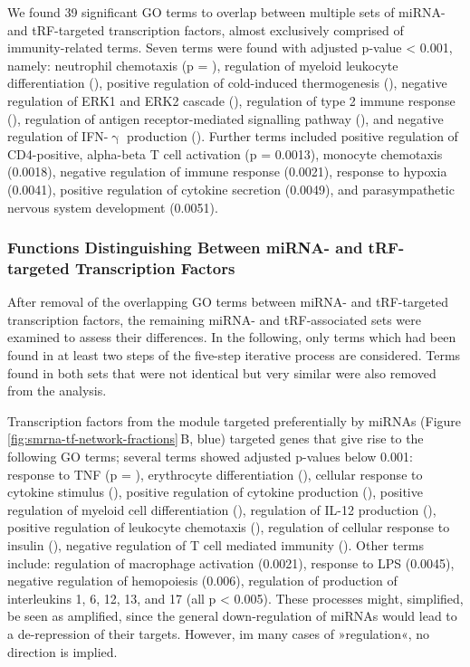 We found 39 significant GO terms to overlap between multiple sets of miRNA- and tRF-targeted transcription factors, almost exclusively comprised of immunity-related terms. Seven terms were found with adjusted p-value < 0.001, namely: neutrophil chemotaxis (p = ), regulation of myeloid leukocyte differentiation (), positive regulation of cold-induced thermogenesis (), negative regulation of ERK1 and ERK2 cascade (), regulation of type 2 immune response (), regulation of antigen receptor-mediated signalling pathway (), and negative regulation of IFN-$\upgamma$ production (). Further terms included positive regulation of CD4-positive, alpha-beta T cell activation (p = 0.0013), monocyte chemotaxis (0.0018), negative regulation of immune response (0.0021), response to hypoxia (0.0041), positive regulation of cytokine secretion (0.0049), and parasympathetic nervous system development (0.0051).

\subsubsection{Functions Distinguishing Between miRNA- and tRF-targeted Transcription Factors}
After removal of the overlapping GO terms between miRNA- and tRF-targeted transcription factors, the remaining miRNA- and tRF-associated sets were examined to assess their differences. In the following, only terms which had been found in at least two steps of the five-step iterative process are considered. Terms found in both sets that were not identical but very similar were also removed from the analysis.

Transcription factors from the module targeted preferentially by miRNAs (Figure \ref{fig:smrna-tf-network-fractions}\,B, blue) targeted genes that give rise to the following GO terms; several terms showed adjusted p-values below 0.001: response to TNF (p = ), erythrocyte differentiation (), cellular response to cytokine stimulus (), positive regulation of cytokine production (), positive regulation of myeloid cell differentiation (), regulation of IL-12 production (), positive regulation of leukocyte chemotaxis (), regulation of cellular response to insulin (), negative regulation of T cell mediated immunity (). Other terms include: regulation of macrophage activation (0.0021), response to LPS (0.0045), negative regulation of hemopoiesis (0.006), regulation of production of interleukins 1, 6, 12, 13, and 17 (all p < 0.005). These processes might, simplified, be seen as amplified, since the general down-regulation of miRNAs would lead to a de-repression of their targets. However, im many cases of »regulation«, no direction is implied.

